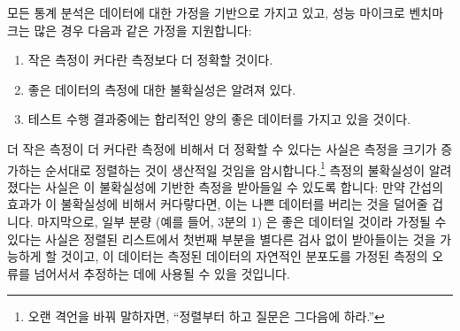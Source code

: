 모든 통계 분석은 데이터에 대한 가정을 기반으로 가지고 있고, 성능 마이크로
벤치마크는 많은 경우 다음과 같은 가정을 지원합니다:

\begin{enumerate}
\item	작은 측정이 커다란 측정보다 더 정확할 것이다.
\item	좋은 데이터의 측정에 대한 불확실성은 알려져 있다.
\item	테스트 수행 결과중에는 합리적인 양의 좋은 데이터를 가지고 있을 것이다.

\end{enumerate}

더 작은 측정이 더 커다란 측정에 비해서 더 정확할 수 있다는 사실은 측정을 크기가
증가하는 순서대로 정렬하는 것이 생산적일 것임을 암시합니다.\footnote{
	오랜 격언을 바꿔 말하자면, ``정렬부터 하고 질문은 그다음에 하라.''}
측정의 불확실성이 알려졌다는 사실은 이 불확실성에 기반한 측정을 받아들일 수
있도록 합니다: 만약 간섭의 효과가 이 불확실성에 비해서 커다랗다면, 이는 나쁜
데이터를 버리는 것을 덜어줄 겁니다.
마지막으로, 일부 분량 (예를 들어, 3분의 1) 은 좋은 데이터일 것이라 가정될 수
있다는 사실은 정렬된 리스트에서 첫번째 부분을 별다른 검사 없이 받아들이는 것을
가능하게 할 것이고, 이 데이터는 측정된 데이터의 자연적인 분포도를 가정된 측정의
오류를 넘어서서 추정하는 데에 사용될 수 있을 것입니다.

